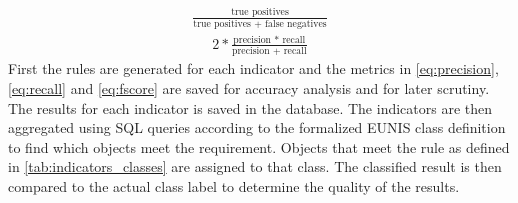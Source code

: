 \documentclass[authoryear,preprint,12pt,number]{elsarticle}
\begin{document}
\begin{equation}
\begin{align*}
    \frac{\text{true positives}}{\text{true positives + false negatives}}
\end{align*}
\label{eq:recall}
\end{equation}
\begin{equation}
\begin{align*}
    2 * \frac{\text{precision * recall}}{\text{precision + recall}}
\end{align*}
\label{eq:fscore}
\end{equation}
First the rules are generated for each indicator and the metrics in
\ref{eq:precision}, \ref{eq:recall} and \ref{eq:fscore} are saved for accuracy
analysis and for later scrutiny. The results for each indicator is saved in the
database. The indicators are then aggregated using SQL queries according to the
formalized EUNIS class definition to find which objects meet the requirement.
Objects that meet the rule as defined in \ref{tab:indicators_classes} are
assigned to that class. The classified result is then compared to the actual
class label to determine the quality of the results.
\end{document}
